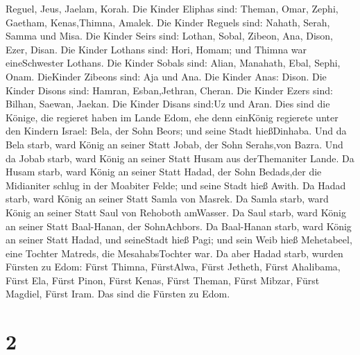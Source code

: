 Reguel, Jeus, Jaelam, Korah.  Die Kinder Eliphas sind:
Theman, Omar, Zephi, Gaetham, Kenas,Thimna, Amalek.  Die
Kinder Reguels sind: Nahath, Serah, Samma und Misa.  Die
Kinder Seirs sind: Lothan, Sobal, Zibeon, Ana, Dison, Ezer, Disan.
 Die Kinder Lothans sind: Hori, Homam; und Thimna war
eineSchwester Lothans.  Die Kinder Sobals sind: Alian,
Manahath, Ebal, Sephi, Onam. DieKinder Zibeons sind: Aja und Ana.
 Die Kinder Anas: Dison. Die Kinder Disons sind: Hamran,
Esban,Jethran, Cheran.  Die Kinder Ezers sind: Bilhan,
Saewan, Jaekan. Die Kinder Disans sind:Uz und Aran.  Dies
sind die Könige, die regieret haben im Lande Edom, ehe denn einKönig
regierete unter den Kindern Israel: Bela, der Sohn Beors; und seine
Stadt hießDinhaba.  Und da Bela starb, ward König an seiner
Statt Jobab, der Sohn Serahs,von Bazra.  Und da Jobab
starb, ward König an seiner Statt Husam aus derThemaniter Lande.
 Da Husam starb, ward König an seiner Statt Hadad, der Sohn
Bedads,der die Midianiter schlug in der Moabiter Felde; und seine Stadt
hieß Awith.  Da Hadad starb, ward König an seiner Statt
Samla von Masrek.  Da Samla starb, ward König an seiner
Statt Saul von Rehoboth amWasser.  Da Saul starb, ward
König an seiner Statt Baal-Hanan, der SohnAchbors.  Da
Baal-Hanan starb, ward König an seiner Statt Hadad, und seineStadt hieß
Pagi; und sein Weib hieß Mehetabeel, eine Tochter Matreds, die
MesahabsTochter war.  Da aber Hadad starb, wurden Fürsten
zu Edom: Fürst Thimna, FürstAlwa, Fürst Jetheth,  Fürst
Ahalibama, Fürst Ela, Fürst Pinon,  Fürst Kenas, Fürst
Theman, Fürst Mibzar,  Fürst Magdiel, Fürst Iram. Das sind
die Fürsten zu Edom.

\hypertarget{section-1}{%
\section{2}\label{section-1}}

